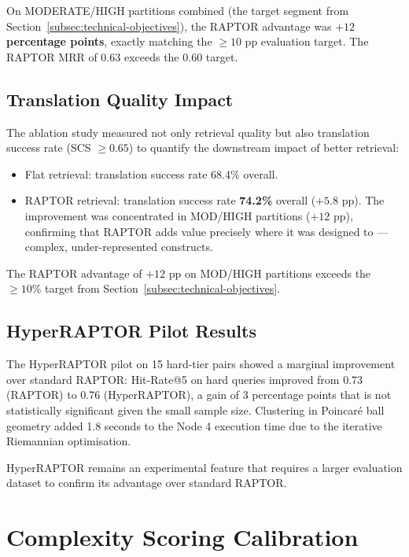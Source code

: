 On MODERATE/HIGH partitions combined (the target segment from
Section~\ref{subsec:technical-objectives}), the RAPTOR advantage was
\textbf{$+12$ percentage points}, exactly matching the $\geq 10$ pp evaluation
target. The RAPTOR MRR of 0.63 exceeds the 0.60 target.

\subsection{Translation Quality Impact}
\label{subsec:raptor-translation-impact}

The ablation study measured not only retrieval quality but also translation
success rate (SCS $\geq 0.65$) to quantify the downstream impact of better
retrieval:

\begin{itemize}
  \item Flat retrieval: translation success rate 68.4\% overall.
  \item RAPTOR retrieval: translation success rate \textbf{74.2\%} overall
    ($+5.8$ pp). The improvement was concentrated in MOD/HIGH partitions
    ($+12$ pp), confirming that RAPTOR adds value precisely where it was
    designed to --- complex, under-represented constructs.
\end{itemize}

The RAPTOR advantage of $+12$ pp on MOD/HIGH partitions exceeds the $\geq 10\%$
target from Section~\ref{subsec:technical-objectives}.

\subsection{HyperRAPTOR Pilot Results}
\label{subsec:hyperraptor-results}

The HyperRAPTOR pilot on 15 hard-tier pairs showed a marginal improvement over
standard RAPTOR: Hit-Rate@5 on hard queries improved from 0.73 (RAPTOR) to 0.76
(HyperRAPTOR), a gain of 3 percentage points that is not statistically
significant given the small sample size. Clustering in Poincaré ball geometry
added 1.8 seconds to the Node 4 execution time due to the iterative Riemannian
optimisation.

HyperRAPTOR remains an experimental feature that requires a larger evaluation
dataset to confirm its advantage over standard RAPTOR.

\section{Complexity Scoring Calibration}
\label{sec:complexity-results}

